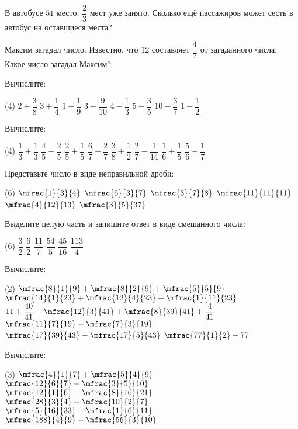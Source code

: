 \begin{class}[number=7]
	\begin{listofex}
	\item В автобусе \( 51 \) место. \( \dfrac{2}{3} \) мест уже занято. Сколько ещё пассажиров может сесть в автобус на оставшиеся места?
	\item Максим загадал число. Известно, что \( 12 \) составляет \( \dfrac{4}{7} \) от загаданного числа. Какое число загадал Максим?
	\item Вычислите:
	\begin{tasks}(4)
		\task \( 2+\dfrac{3}{8} \)
		\task \( 3+\dfrac{1}{4} \)
		\task \( 1+\dfrac{1}{9} \)
		\task \( 3+\dfrac{9}{10} \)
		\task \( 4-\dfrac{1}{3} \)
		\task \( 5-\dfrac{3}{5} \)
		\task \( 10-\dfrac{3}{7} \)
		\task \( 1-\dfrac{1}{2} \)
	\end{tasks}
	\item Вычислите:
		\begin{tasks}(4)
		\task \( \dfrac{1}{3}+\dfrac{1}{3} \)
		\task \( \dfrac{4}{5}-\dfrac{2}{5} \)
		\task \( \dfrac{2}{5}+\dfrac{1}{5} \)
		\task \( \dfrac{6}{7}-\dfrac{2}{7} \)
		\task \( \dfrac{3}{8}+\dfrac{1}{2} \)
		\task \( \dfrac{2}{7}-\dfrac{1}{14} \)
		\task \( \dfrac{1}{6}+\dfrac{1}{5} \)
		\task \( \dfrac{5}{6}-\dfrac{1}{7} \)
	\end{tasks}
	\item Представьте число в виде неправильной дроби:
		\begin{tasks}(6)
		\task \( \mfrac{1}{3}{4} \)
		\task \( \mfrac{6}{3}{7} \)
		\task \( \mfrac{3}{7}{8} \)
		\task \( \mfrac{11}{11}{11} \)
		\task \( \mfrac{4}{12}{13} \)
		\task \( \mfrac{3}{5}{37} \)
	\end{tasks}
	\item Выделите целую часть и запишите ответ в виде смешанного числа:
		\begin{tasks}(6)
		\task \( \dfrac{3}{2} \)
		\task \( \dfrac{6}{2} \)
		\task \( \dfrac{11}{7} \)
		\task \( \dfrac{54}{5} \)
		\task \( \dfrac{45}{16} \)
		\task \( \dfrac{113}{4} \)
	\end{tasks}
	\item Вычислите:
		\begin{tasks}(2)
		\task \( \mfrac{8}{1}{9}+\mfrac{8}{2}{9}+\mfrac{5}{5}{9} \)
		\task \( \mfrac{14}{1}{23}+\mfrac{12}{4}{23}+\mfrac{1}{11}{23} \)
		\task \( 11+\dfrac{40}{41}+\mfrac{12}{3}{41}+\mfrac{8}{39}{41}+\dfrac{4}{41} \)
		\task \( \mfrac{11}{7}{19}-\mfrac{7}{3}{19} \)
		\task \( \mfrac{17}{39}{43}-\mfrac{17}{5}{43} \)
		\task \( \mfrac{77}{1}{2}-77 \)
	\end{tasks}
		\item Вычислите:
		\begin{tasks}(3)
		\task \( \mfrac{4}{1}{7}+\mfrac{5}{4}{9} \)
		\task \( \mfrac{12}{6}{7}-\mfrac{3}{5}{10} \)
		\task \( \mfrac{12}{1}{6}+\mfrac{8}{16}{21} \)
		\task \( \mfrac{28}{3}{4}-\mfrac{10}{2}{7} \)
		\task \( \mfrac{5}{16}{33}+\mfrac{1}{6}{11} \)
		\task \( \mfrac{188}{4}{9}-\mfrac{56}{3}{10} \)
		\end{tasks}
\end{listofex}
\end{class}

